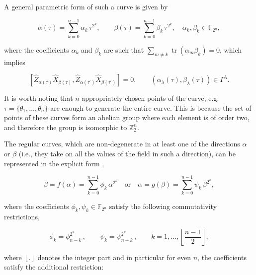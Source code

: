 \documentclass[quantumrep,article,submit,pdftex,moreauthors]{Definitions/mdpi}
\DeclareMathOperator{\tr}{tr}
\begin{document}
A general parametric form of such a curve is given by

\begin{equation}
  \alpha (\tau)
  = \sum_{k=0}^{n-1}\alpha_{k}\,\tau^{2^{k}}, \qquad \beta(\tau)
  = \sum_{k=0}^{n-1}\beta_{k} \, \tau^{2^{k}},
  \quad \alpha_{k},\beta_{k}\in \mathbb{F}_{2^{n}},
  \label{curve1a}
\end{equation}

where the coefficients $\alpha_k$ and $\beta_k$ are such that $\sum_{m \neq k}
\tr(\alpha_{m}\beta_{k})=0$, which implies

\begin{equation}
  \left[
    \hat{Z}_{\alpha (\tau )}\hat{X}_{\beta (\tau )},
    \hat{Z}_{\alpha(\tau^{\prime })}\hat{X}_{\beta(\tau^{\prime})}
  \right] = 0,
  \qquad \left( \alpha_{\lambda}(\tau),\beta_{\lambda}(\tau) \right)
  \in \Gamma^{\lambda }.
  \label{stab}
\end{equation}

It is worth noting that $n$ appropriately chosen points of the curve, e.g. $\tau
= \{\theta _{1},\ldots,\theta_{n}\}$ are enough to generate the entire curve.
This is because the set of points of these curves form an abelian group where
each element is of order two, and therefore the group is isomorphic to
$\mathbb{Z}_{2}^n$.

The regular curves, which are non-degenerate in at least one of the directions
$\alpha$ or $\beta$ (i.e., they take on all the values of the field in such a
direction), can be represented in the explicit form \cite{GS2},

\begin{equation}
  \beta = f(\alpha)
  = \sum_{k=0}^{n-1} \phi_{k} \, \alpha^{2^{k}}
  \quad \text{or} \quad
  \alpha = g(\beta) = \sum_{k=0}^{n-1} \psi_{k}\,\beta^{2^{k}},
  \label{RC}
\end{equation}

where the coefficients $\phi_{k},\psi_{k} \in \mathbb{F}_{2^{n}}$ satisfy the
following commutativity restrictions,

\begin{equation}
  \phi_{k} = \phi _{n-k}^{2^{k}}\,,
  \qquad \psi_{k} = \psi_{n-k}^{2^{k}}\,,
  \qquad k=1,\ldots, \left\lfloor \frac{n-1}{2}\right\rfloor,
  \label{Acc}
\end{equation}

where $\left\lfloor . \right\rfloor$ denotes the integer part and in particular
for even $n$, the coefficients satisfy the additional restriction: 
\end{document}
